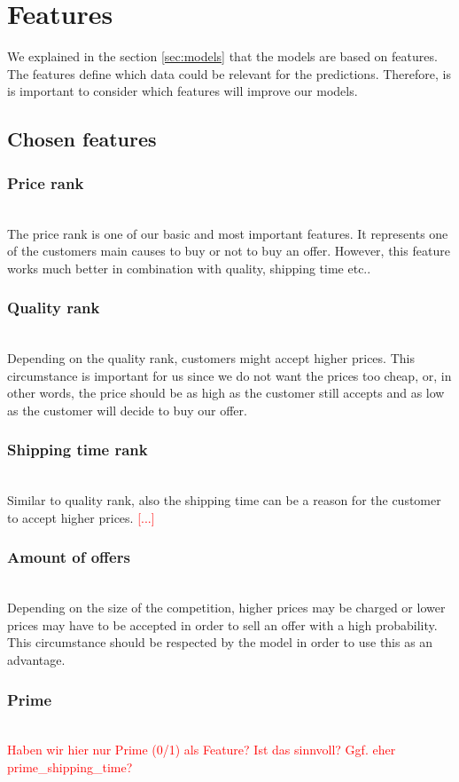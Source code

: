 \section{Features}
\label{sec:features}

	We explained in the section \ref{sec:models} that the models are based on features. The features define which data could be relevant for the predictions. Therefore, is is important to consider which features will improve our models.
\subsection{Chosen features}
\subsubsection{Price rank}
\label{sec:pricerank}
	~\\
	The price rank is one of our basic and most important features. It represents one of the customers main causes to buy or not to buy an offer. However, this feature works much better in combination with quality, shipping time etc..
\subsubsection{Quality rank}
	~\\
	Depending on the quality rank, customers might accept higher prices. This circumstance is important for us since we do not want the prices too cheap, or, in other words, the price should be as high as the customer still accepts and as low as the customer will decide to buy our offer.
\subsubsection{Shipping time rank}
	~\\
	Similar to quality rank, also the shipping time can be a reason for the customer to accept higher prices. \textcolor{red}{[...]}
\subsubsection{Amount of offers}
	~\\
	Depending on the size of the competition, higher prices may be charged or lower prices may have to be accepted in order to sell an offer with a high probability. This circumstance should be respected by the model in order to use this as an advantage.
\subsubsection{Prime}
	~\\
	\textcolor{red}{Haben wir hier nur Prime (0/1) als Feature? Ist das sinnvoll? Ggf. eher prime\_shipping\_time?}
